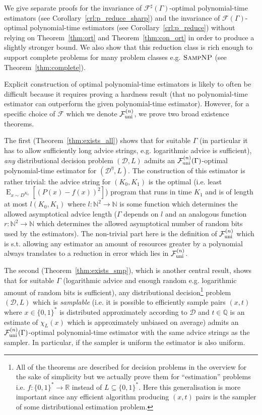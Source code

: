 \documentclass{article}
\numberwithin{equation}{section}
\theoremstyle{definition}
\theoremstyle{plain}
\newcommand{\Bool}{\{0,1\}}
\newcommand{\Words}{{\Bool^*}}
\DeclareMathOperator{\E}{E}
\newcommand{\Nats}{\mathbb{N}}
\newcommand{\Rats}{\mathbb{Q}}
\newcommand{\Reals}{\mathbb{R}}
\newcommand{\Dist}{\mathcal{D}}
\newcommand{\Fall}{\mathcal{F}}
\newcommand{\EG}{\Fall(\Gamma)}
\newcommand{\ESG}{\Fall^\sharp(\Gamma)}
\newcommand{\FallU}{{\Fall_{\textnormal{uni}}^{(n)}}}
\begin{document}
We give separate proofs for the invariance of ${\ESG}$-optimal polynomial-time estimators (see Corollary~\ref{crl:p_reduce_sharp}) and the invariance of ${\EG}$-optimal polynomial-time estimators (see Corollary~\ref{crl:p_reduce}) without relying on Theorem~\ref{thm:ort} and Theorem~\ref{thm:con_ort} in order to produce a slightly stronger bound. We also show that this reduction class is rich enough to support complete problems for many problem classes e.g. ${\textsc{SampNP}}$ (see Theorem~\ref{thm:complete}).

Explicit construction of optimal polynomial-time estimators is likely to often be difficult because it requires proving a hardness result (that no polynomial-time estimator can outperform the given polynomial-time estimator). However, for a specific choice of ${\Fall}$ which we denote ${\FallU}$, we prove two broad existence theorems.

The first (Theorem~\ref{thm:exists_all}) shows that for suitable ${\Gamma}$ (in particular it has to allow sufficiently long advice strings, e.g. logarithmic advice is sufficient), \emph{any} distributional decision problem ${(\Dist,L)}$ admits an ${\FallU(\Gamma)}$-optimal polynomial-time estimator for ${(\Dist^\eta,L)}$. The construction of this estimator is rather trivial: the advice string for ${(K_0,K_1)}$ is the optimal (i.e. least ${\E_{x \sim D^{K_0}}[(P(x)-f(x))^2]}$) program that runs in time ${K_1}$ and is of length at most ${l(K_0,K_1)}$ where ${l: \Nats^2 \rightarrow \Nats}$ is some function which determines the allowed asymptotical advice length (${\Gamma}$ depends on ${l}$ and an analogous function ${r: \Nats^2 \rightarrow \Nats}$ which determines the allowed asymptotical number of random bits used by the estimators). The non-trivial part here is the definition of ${\FallU}$ which is s.t. allowing any estimator an amount of resources greater by a polynomial always translates to a reduction in error which lies in ${\FallU}$.

The second (Theorem~\ref{thm:exists_smp}), which is another central result, shows that for suitable ${\Gamma}$ (logarithmic advice and enough random e.g. logarithmic amount of random bits is sufficient), any distributional decision\footnote{All of the theorems are described for decision problems in the overview for the sake of simplicity but we actually prove them for \enquote{estimation} problems i.e. ${f: \Words \rightarrow \Reals}$ instead of ${L \subseteq \Words}$. Here this generalisation is more important since any efficient algorithm producing ${(x,t)}$ pairs is the sampler of some distributional estimation problem.} problem ${(\Dist,L)}$ which is \emph{samplable} (i.e. it is possible to efficiently sample pairs ${(x,t)}$ where ${x \in \Words}$ is distributed approximately according to ${\Dist}$ and ${t \in \Rats}$ is an estimate of ${\chi_L(x)}$ which is approximately unbiased on average) admits an ${\FallU(\Gamma)}$-optimal polynomial-time estimator with the same advice strings as the sampler. In particular, if the sampler is uniform the estimator is also uniform.
\end{document}
